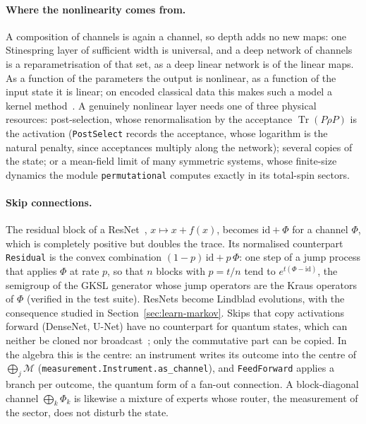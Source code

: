 \documentclass[11pt]{article}
\DeclareMathOperator{\Tr}{Tr}
\newcommand{\M}{\mathcal{M}}
\begin{document}
\paragraph{Where the nonlinearity comes from.} A composition of channels is again a channel, so depth adds no new
maps: one Stinespring layer of sufficient width is universal, and a deep network of channels is a reparametrisation of
that set, as a deep linear network is of the linear maps. As a function of the parameters the output is nonlinear, as a
function of the input state it is linear; on encoded classical data this makes such a model a kernel
method~\cite{schuld2021}. A
genuinely nonlinear layer needs one of three physical resources: post-selection, whose renormalisation by the
acceptance $\Tr(P\rho P)$ is the activation (\texttt{PostSelect} records the acceptance, whose logarithm is the natural
penalty, since acceptances multiply along the network); several copies of the state; or a mean-field limit of many
symmetric systems, whose finite-size dynamics the module \texttt{permutational} computes exactly in its total-spin
sectors.

\paragraph{Skip connections.} The residual block of a ResNet~\cite{he2016}, $x\mapsto x+f(x)$, becomes
$\mathrm{id}+\Phi$ for a channel $\Phi$, which is completely positive but doubles the trace. Its normalised counterpart \texttt{Residual} is the convex combination $(1-p)\,\mathrm{id}+p\,\Phi$: one
step of a jump process that applies $\Phi$ at rate $p$, so that $n$ blocks with $p=t/n$ tend to
$e^{t(\Phi-\mathrm{id})}$, the semigroup of the GKSL generator whose jump operators are the Kraus operators of $\Phi$
(verified in the test suite). ResNets become Lindblad evolutions, with the consequence studied in
Section~\ref{sec:learn-markov}. Skips that copy activations forward (DenseNet, U-Net) have no counterpart for quantum
states, which can neither be cloned nor broadcast~\cite{barnum1996}; only the commutative part can be copied. In the
algebra this is the centre: an instrument writes its outcome into the centre of $\bigoplus_j\M$
(\texttt{measurement.Instrument.as\_channel}), and \texttt{FeedForward} applies a branch per outcome, the quantum form of
a fan-out connection. A block-diagonal channel $\bigoplus_k\Phi_k$ is likewise a mixture of experts whose router, the
measurement of the sector, does not disturb the state.
\end{document}
